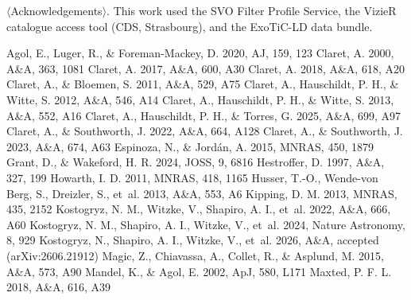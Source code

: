 \documentclass{aa}
\begin{document}
\begin{acknowledgements}
$\langle$Acknowledgements$\rangle$. This work used the SVO Filter Profile
Service, the VizieR catalogue access tool (CDS, Strasbourg), and the ExoTiC-LD
data bundle.
\end{acknowledgements}


\begin{thebibliography}{}
 Agol, E., Luger, R., \& Foreman-Mackey, D. 2020, AJ, 159, 123
 Claret, A. 2000, A\&A, 363, 1081
 Claret, A. 2017, A\&A, 600, A30
 Claret, A. 2018, A\&A, 618, A20
 Claret, A., \& Bloemen, S. 2011, A\&A, 529, A75
 Claret, A., Hauschildt, P. H., \& Witte, S. 2012, A\&A, 546, A14
 Claret, A., Hauschildt, P. H., \& Witte, S. 2013, A\&A, 552, A16
 Claret, A., Hauschildt, P. H., \& Torres, G. 2025, A\&A, 699, A97
 Claret, A., \& Southworth, J. 2022, A\&A, 664, A128
 Claret, A., \& Southworth, J. 2023, A\&A, 674, A63
 Espinoza, N., \& Jord{\'a}n, A. 2015, MNRAS, 450, 1879
 Grant, D., \& Wakeford, H. R. 2024, JOSS, 9, 6816
 Hestroffer, D. 1997, A\&A, 327, 199 %
 Howarth, I. D. 2011, MNRAS, 418, 1165 %
 Husser, T.-O., Wende-von Berg, S., Dreizler, S., et~al. 2013, A\&A, 553, A6
 Kipping, D. M. 2013, MNRAS, 435, 2152
 Kostogryz, N. M., Witzke, V., Shapiro, A. I., et~al. 2022, A\&A, 666, A60
 Kostogryz, N. M., Shapiro, A. I., Witzke, V., et~al. 2024, Nature Astronomy, 8, 929 %
 Kostogryz, N., Shapiro, A. I., Witzke, V., et~al. 2026, A\&A, accepted (arXiv:2606.21912)
 Magic, Z., Chiavassa, A., Collet, R., \& Asplund, M. 2015, A\&A, 573, A90
 Mandel, K., \& Agol, E. 2002, ApJ, 580, L171
 Maxted, P. F. L. 2018, A\&A, 616, A39

\end{thebibliography}
\end{document}
